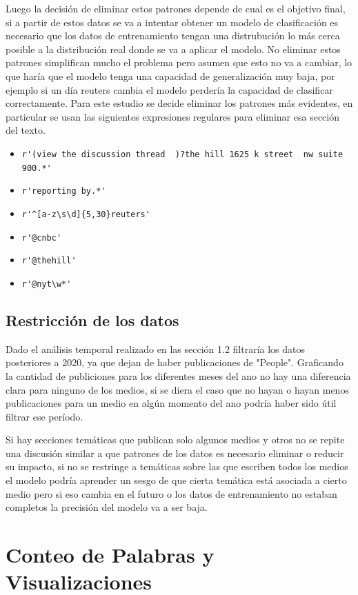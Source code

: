 \documentclass[11pt, a4paper]{article}
\begin{document}
Luego la decisión de eliminar estos patrones depende de cual es el objetivo final, 
si a partir de estos datos se va a intentar obtener un modelo de clasificación 
es necesario que los datos de entrenamiento tengan una distrubución lo más cerca 
posible a la distribución real donde se va a aplicar el modelo. 
No eliminar estos patrones simplifican mucho el problema pero asumen que esto no va a cambiar, 
lo que haría que el modelo tenga una capacidad de generalización muy baja, por ejemplo 
si un día reuters cambia el modelo perdería la capacidad de clasificar correctamente. 
Para este estudio se decide eliminar los patrones más evidentes, en particular se usan las siguientes
expresiones regulares para eliminar esa sección del texto.
\begin{itemize}
    \item \verb|r'(view the discussion thread  )?the hill 1625 k street  nw suite 900.*'|
    \item \verb|r'reporting by.*'|
    \item \verb|r'^[a-z\s\d]{5,30}reuters'|
    \item \verb|r'@cnbc'|
    \item \verb|r'@thehill'|
    \item \verb|r'@nyt\w*'|
\end{itemize}

\subsection{Restricción de los datos}

Dado el análisis temporal realizado en las sección 1.2 filtraría los datos posteriores a 2020, 
ya que dejan de haber publicaciones de "People". 
Graficando la cantidad de publiciones para los diferentes meses del ano no hay una diferencia 
clara para ninguno de los medios, si se diera el caso que no hayan o hayan menos publicaciones 
para un medio en algún momento del ano podría haber sido útil filtrar ese período.

Si hay secciones temáticas que publican solo algunos medios y otros no se repite una discusión 
similar a que patrones de los datos es necesario eliminar o reducir su impacto, 
si no se restringe a temáticas sobre las que escriben todos los medios el modelo podría aprender 
un sesgo de que cierta temática está asociada a cierto medio pero si eso cambia en el futuro o 
los datos de entrenamiento no estaban completos la precisión del modelo va a ser baja.

\section{Conteo de Palabras y Visualizaciones}
\end{document}
